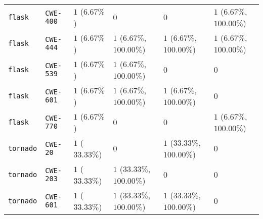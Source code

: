 \begin{table}
\begin{tabular}{llllll}
\texttt{flask} & \texttt{CWE-400} & $1$ ($6.67\%$) & $0$ & $0$ & $1$ ($6.67\%$, $100.00\%$) \\
\texttt{flask} & \texttt{CWE-444} & $1$ ($6.67\%$) & $1$ ($6.67\%$, $100.00\%$) & $1$ ($6.67\%$, $100.00\%$) & $1$ ($6.67\%$, $100.00\%$) \\
\texttt{flask} & \texttt{CWE-539} & $1$ ($6.67\%$) & $1$ ($6.67\%$, $100.00\%$) & $0$ & $0$ \\
\texttt{flask} & \texttt{CWE-601} & $1$ ($6.67\%$) & $1$ ($6.67\%$, $100.00\%$) & $1$ ($6.67\%$, $100.00\%$) & $0$ \\
\texttt{flask} & \texttt{CWE-770} & $1$ ($6.67\%$) & $0$ & $0$ & $1$ ($6.67\%$, $100.00\%$) \\
\texttt{tornado} & \texttt{CWE-20} & $1$ ($33.33\%$) & $0$ & $1$ ($33.33\%$, $100.00\%$) & $0$ \\
\texttt{tornado} & \texttt{CWE-203} & $1$ ($33.33\%$) & $1$ ($33.33\%$, $100.00\%$) & $0$ & $0$ \\
\texttt{tornado} & \texttt{CWE-601} & $1$ ($33.33\%$) & $1$ ($33.33\%$, $100.00\%$) & $1$ ($33.33\%$, $100.00\%$) & $0$ \\
\bottomrule
\end{tabular}
\end{table}
